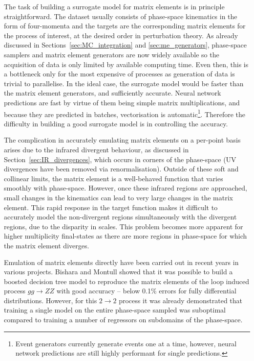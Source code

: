 \documentclass[main.tex]{subfiles}
\begin{document}
    The task of building a surrogate
    model for matrix elements is in principle straightforward.
    The dataset usually consists of phase-space kinematics
    in the form of four-momenta and the targets are the
    corresponding matrix elements for the process of interest,
    at the desired order in perturbation theory. As already
    discussed in Sections~\ref{sec:MC_integration} and \ref{sec:me_generators},
    phase-space samplers and matrix element generators are
    now widely available so the acquisition of data is only
    limited by available computing time. Even then, this is a bottleneck only
    for the most expensive of processes as generation
    of data is trivial to parallelise. In the ideal case, the
    surrogate model would be faster than the matrix
    element generators, and sufficiently accurate. Neural
    network predictions are fast by virtue of them being
    simple matrix multiplications, and because they are predicted
    in batches, vectorisation is automatic\footnote{Event generators currently generate events one at a time, however, neural network predictions are still highly performant for single predictions.}.
    Therefore the difficulty
    in building a good surrogate model is in controlling
    the accuracy.

    The complication in accurately emulating matrix elements
    on a per-point basis arises due to the infrared divergent behaviour,
    as discussed in Section~\ref{sec:IR_divergences}, which occurs
    in corners of the phase-space
    (UV divergences have been removed via renormalisation).
    Outside of these soft and collinear limits, the matrix element
    is a well-behaved function that varies smoothly with phase-space.
    However, once these infrared regions are approached, small changes in the
    kinematics can lead to very large changes in the matrix
    element. This rapid response in the target
    function makes it difficult to accurately model the
    non-divergent regions simultaneously with the divergent
    regions, due to the disparity in scales. This problem
    becomes more apparent for higher multiplicity final-states
    as there are more regions in phase-space for which
    the matrix element diverges.

    Emulation of matrix elements directly have been
    carried out in recent years in various projects.
    Bishara and Montull showed \cite{Bishara:2019iwh} that it was possible to
    build a boosted decision tree model to reproduce
    the matrix elements of the loop induced process $gg \rightarrow ZZ$ with good accuracy --
    below 0.1\% errors for fully differential distributions.
    However, for this $2 \rightarrow 2$ process it was already demonstrated
    that training a single model on the entire phase-space sampled
    was suboptimal compared to training a number of regressors
    on subdomains of the phase-space.
\end{document}
